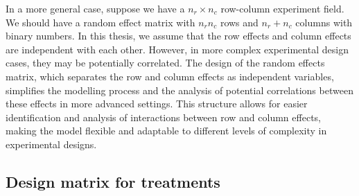 \documentclass[
  a4paper,
  oneside,
  openany,
  12pt,
  onecolumn]{book}
\theoremstyle{definition}
\theoremstyle{definition}
\theoremstyle{plain}
\theoremstyle{remark}
\begin{document}
In a more general case, suppose we have a \(n_r\times n_c\) row-column
experiment field. We should have a random effect matrix with \(n_rn_c\)
rows and \(n_r+n_c\) columns with binary numbers. In this thesis, we
assume that the row effects and column effects are independent with each
other. However, in more complex experimental design cases, they may be
potentially correlated. The design of the random effects matrix, which
separates the row and column effects as independent variables,
simplifies the modelling process and the analysis of potential
correlations between these effects in more advanced settings. This
structure allows for easier identification and analysis of interactions
between row and column effects, making the model flexible and adaptable
to different levels of complexity in experimental designs.

\subsection{Design matrix for
treatments}\label{design-matrix-for-treatments}
\end{document}

